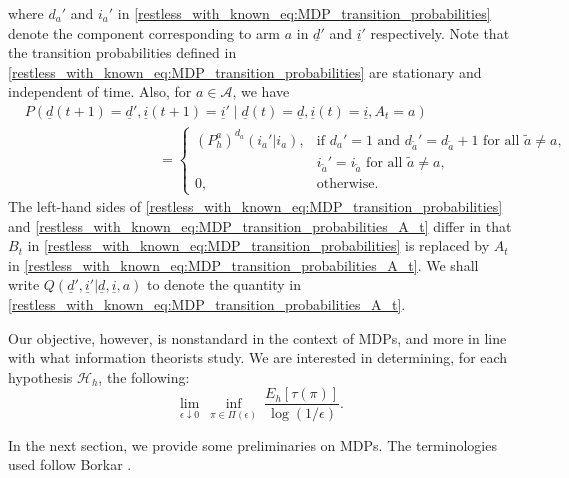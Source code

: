 where $d_a'$ and $i_a'$ in \eqref{restless_with_known_eq:MDP_transition_probabilities} denote the component corresponding to arm $a$ in $\underline{d}'$ and $\underline{i}'$ respectively. Note that the transition probabilities defined in \eqref{restless_with_known_eq:MDP_transition_probabilities} are stationary and independent of time. Also, for $a\in \mathcal{A}$, we have
\begin{align}
	&P(\underline{d}(t+1)=\underline{d}',\underline{i}(t+1)=\underline{i}'\mid \underline{d}(t)=\underline{d},\underline{i}(t)=\underline{i}, A_t=a)\nonumber\\
	&\hspace{4cm}=\begin{cases}
		(P_h^a)^{d_a}(i_a'|i_a),&\text{if }d_a'=1\text{ and }d_{\tilde{a}}'=d_{\tilde{a}}+1\text{ for all }\tilde{a}\neq a,\\
		&i_{\tilde{a}}'=i_{\tilde{a}}\text{ for all }\tilde{a}\neq a,\\
		0,&\text{otherwise}.
	\end{cases}\label{restless_with_known_eq:MDP_transition_probabilities_A_t}
\end{align}
The left-hand sides of \eqref{restless_with_known_eq:MDP_transition_probabilities} and \eqref{restless_with_known_eq:MDP_transition_probabilities_A_t} differ in that $B_t$ in \eqref{restless_with_known_eq:MDP_transition_probabilities} is replaced by $A_t$ in \eqref{restless_with_known_eq:MDP_transition_probabilities_A_t}. We shall write $Q(\underline{d}',\underline{i}'|\underline{d},\underline{i},a)$ to denote the quantity in \eqref{restless_with_known_eq:MDP_transition_probabilities_A_t}.

Our objective, however, is nonstandard in the context of MDPs, and more in line with what information theorists study. We are interested in determining, for each hypothesis $\mathcal{H}_h$, the following:
\begin{equation}
  \label{restless_with_known_eqn:objective}
  \lim_{\epsilon \downarrow 0} ~ \inf_{\pi \in \Pi(\epsilon)} ~ \frac{E_h [\tau(\pi)]}{\log (1/\epsilon)}.
\end{equation}

In the next section, we provide some preliminaries on MDPs. The terminologies used follow Borkar \cite{borkar1988control}.

